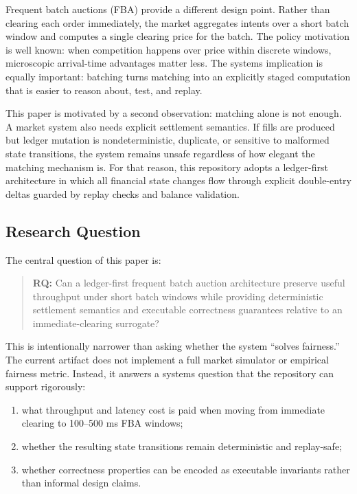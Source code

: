 \documentclass[11pt]{article}
\begin{document}
Frequent batch auctions (FBA) provide a different design point. Rather than clearing each order immediately, the market aggregates intents over a short batch window and computes a single clearing price for the batch. The policy motivation is well known: when competition happens over price within discrete windows, microscopic arrival-time advantages matter less. The systems implication is equally important: batching turns matching into an explicitly staged computation that is easier to reason about, test, and replay.

This paper is motivated by a second observation: matching alone is not enough. A market system also needs explicit settlement semantics. If fills are produced but ledger mutation is nondeterministic, duplicate, or sensitive to malformed state transitions, the system remains unsafe regardless of how elegant the matching mechanism is. For that reason, this repository adopts a ledger-first architecture in which all financial state changes flow through explicit double-entry deltas guarded by replay checks and balance validation.

\subsection{Research Question}

The central question of this paper is:

\begin{quote}
\textbf{RQ:} Can a ledger-first frequent batch auction architecture preserve useful throughput under short batch windows while providing deterministic settlement semantics and executable correctness guarantees relative to an immediate-clearing surrogate?
\end{quote}

This is intentionally narrower than asking whether the system ``solves fairness.'' The current artifact does not implement a full market simulator or empirical fairness metric. Instead, it answers a systems question that the repository can support rigorously:

\begin{enumerate}[leftmargin=1.5em]
  \item what throughput and latency cost is paid when moving from immediate clearing to 100--500 ms FBA windows;
  \item whether the resulting state transitions remain deterministic and replay-safe;
  \item whether correctness properties can be encoded as executable invariants rather than informal design claims.
\end{enumerate}
\end{document}

